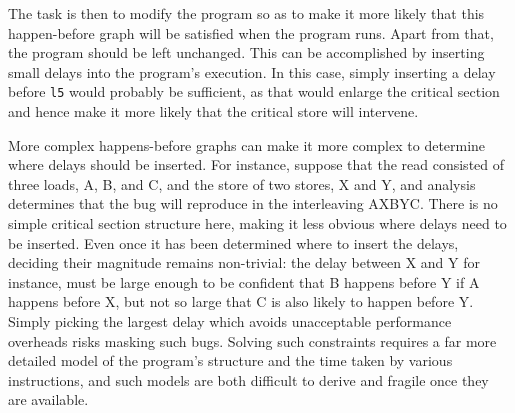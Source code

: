 
The task is then to modify the program so as to make it more likely that this happen-before graph will be satisfied when the program runs.
Apart from that, the program should be left unchanged.
This can be accomplished by inserting small delays into the program's execution.
In this case, simply inserting a delay before \verb|l5| would probably be sufficient, as that would enlarge the critical section and hence make it more likely that the critical store will intervene.

More complex happens-before graphs can make it more complex to determine where delays should be inserted.
For instance, suppose that the read \StateMachine consisted of three loads, A, B, and C, and the store \StateMachine of two stores, X and Y, and analysis determines that the bug will reproduce in the interleaving AXBYC.
There is no simple critical section structure here, making it less obvious where delays need to be inserted.
Even once it has been determined where to insert the delays, deciding their magnitude remains non-trivial: the delay between X and Y for instance, must be large enough to be confident that B happens before Y if A happens before X, but not so large that C is also likely to happen before Y.
Simply picking the largest delay which avoids unacceptable performance overheads risks masking such bugs.
Solving such constraints requires a far more detailed model of the program's structure and the time taken by various instructions, and such models are both difficult to derive and fragile once they are available.

